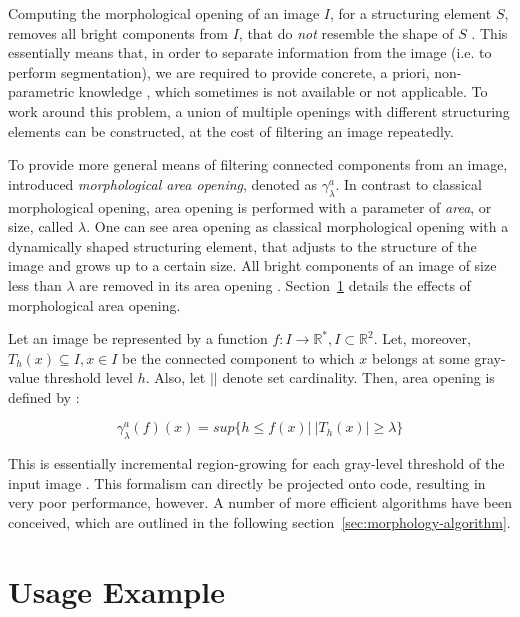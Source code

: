 Computing the morphological opening of an image $I$, for a structuring element
$S$, removes all bright components from $I$, that do \emph{not} resemble the
shape of $S$ \cite{Serra1992Overview}. This essentially means that, in order to
separate information from the image (i.e. to perform segmentation), we are
required to provide concrete, a priori, non-parametric knowledge
\cite{Vincent1994Morphological}, which sometimes is not available or not
applicable. To work around this problem, a union of multiple openings with
different structuring elements can be constructed, at the cost of filtering an
image repeatedly.

To provide more general means of filtering connected components from an image,
\citet{Vincent1994Morphological} introduced \emph{morphological area opening},
denoted as $\gamma^a_{\lambda}$. In contrast to classical morphological opening,
area opening is performed with a parameter of \emph{area}, or size, called
$\lambda$. One can see area opening as classical morphological opening with a
dynamically shaped structuring element, that adjusts to the structure of the
image and grows up to a certain size. All bright components of an image of size
less than $\lambda$ are removed in its area opening
\cite{Vincent1994Morphological}. Section~\ref{sec:morphology-examples} details
the effects of morphological area opening.

Let an image be represented by a function $f: I \rightarrow \mathbb{R}^*, I
\subset \mathbb{R}^2$. Let, moreover, $T_h(x) \subseteq I, x \in I$ be the
connected component to which $x$ belongs at some gray-value threshold level
$h$. Also, let $\left\vert{}\right\vert$ denote set cardinality. Then, area
opening is defined by \cite{Vincent1994Morphological}:

\begin{equation}
  \gamma^a_{\lambda}(f)(x) = sup\{h \leq f(x) \vert ~ \left\vert{T_h(x)}\right\vert \geq \lambda \}
\end{equation}

This is essentially incremental region-growing for each gray-level threshold of
the input image \cite{Vincent1994Morphological}. This formalism can directly be
projected onto code, resulting in very poor performance, however. A number of
more efficient algorithms have been conceived, which are outlined in the
following section~\ref{sec:morphology-algorithm}.

\section{Usage Example}
\label{sec:morphology-examples}

